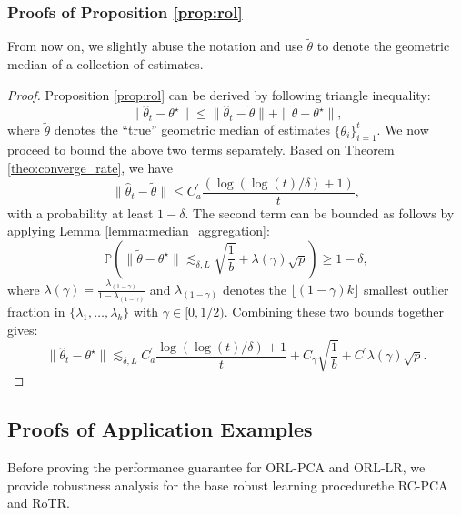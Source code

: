 \documentclass[11pt]{article}
\newcommand{\Norm}[1]{ \| #1 \| }
\begin{document}
\subsubsection{Proofs of Proposition \ref{prop:rol}}
From now on, we slightly abuse the notation and use $\widetilde{\theta}$ to denote the geometric median of a collection of estimates.
\begin{proof}
	Proposition \ref{prop:rol} can be derived by following triangle inequality:
	\begin{equation*}
	\|\widehat{\theta}_t - \theta^\star\| \leq \|\widehat{\theta}_t - \widetilde{\theta}\| + \|\widetilde{\theta} - \theta^\star\|,
	\end{equation*}
	where $\widetilde{\theta}$ denotes the ``true'' geometric median of estimates $\{\theta_i\}_{i=1}^t$.
	We now proceed to bound the above two terms separately. Based on Theorem \ref{theo:converge_rate}, we have
	\begin{equation*}
	\|\widehat{\theta}_t - \widetilde{\theta}\| \leq C_a^\prime \frac{( \log(\log(t)/\delta)+1)}{ t},
	\end{equation*}
	with a probability at least $ 1-\delta $. The second term can be bounded as follows by applying Lemma \ref{lemma:median_aggregation}:
	\begin{equation*}
	\mathbb{P}\left(\Norm{\widetilde{\theta}  - \theta^\star } \lesssim_{\delta, L}  \sqrt{\frac{1}{b}} + \lambda(\gamma) \sqrt{p} \right) \geq 1-\delta,
	\end{equation*}
	where $\lambda(\gamma) = \frac{\lambda_{(1-\gamma)}}{1-\lambda_{(1-\gamma)}}$ and $\lambda_{(1-\gamma)}$ denotes the $ \lfloor (1-\gamma) k \rfloor $ smallest outlier fraction in $ \{\lambda_1,\ldots,\lambda_k\} $ with $ \gamma \in [0,1/2) $. Combining these two bounds together gives:
	\begin{equation*}
	\|\widehat{\theta}_t - \theta^\star\| \lesssim_{\delta,L} C_a^\prime \frac{ \log(\log(t)/\delta)+1}{t} + C_\gamma  \sqrt{\frac{1}{b}} + C^\prime \lambda(\gamma)\sqrt{p}.
	\end{equation*}
	
\end{proof}

\subsection{Proofs of Application Examples}
Before proving the performance guarantee for ORL-PCA and ORL-LR, we provide robustness analysis for the base robust learning procedure\textemdash the RC-PCA and RoTR.
\end{document}
